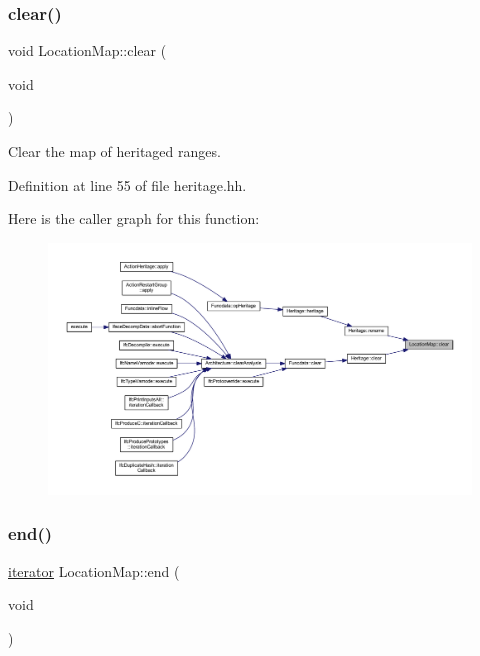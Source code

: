 \subsubsection{\texorpdfstring{clear()}{clear()}}
{\footnotesize\ttfamily void Location\+Map\+::clear (\begin{DoxyParamCaption}\item[{void}]{ }\end{DoxyParamCaption})\hspace{0.3cm}{\ttfamily [inline]}}



Clear the map of heritaged ranges. 



Definition at line 55 of file heritage.\+hh.

Here is the caller graph for this function\+:
\nopagebreak
\begin{figure}[H]
\begin{center}
\leavevmode
\includegraphics[width=350pt]{class_location_map_a76bf666b4ad4b511cfd0290b9b04aa72_icgraph}
\end{center}
\end{figure}
\mbox{\label{class_location_map_a9d4bddedee005e780986d9752b93e4f0}} 
\subsubsection{\texorpdfstring{end()}{end()}}
{\footnotesize\ttfamily \mbox{\hyperlink{class_location_map_a13612b4d0583b85205f3ad6476c2aef9}{iterator}} Location\+Map\+::end (\begin{DoxyParamCaption}\item[{void}]{ }\end{DoxyParamCaption})\hspace{0.3cm}{\ttfamily [inline]}}



